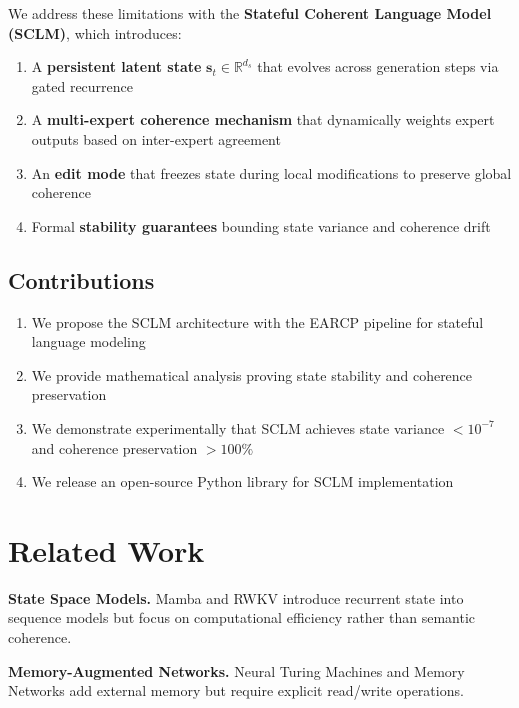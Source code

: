 \documentclass[11pt,a4paper]{article}
\newcommand{\state}{\mathbf{s}}
\newcommand{\Real}{\mathbb{R}}
\begin{document}
We address these limitations with the \textbf{Stateful Coherent Language Model (SCLM)}, which introduces:

\begin{enumerate}
    \item A \textbf{persistent latent state} $\state_t \in \Real^{d_s}$ that evolves across generation steps via gated recurrence
    \item A \textbf{multi-expert coherence mechanism} that dynamically weights expert outputs based on inter-expert agreement
    \item An \textbf{edit mode} that freezes state during local modifications to preserve global coherence
    \item Formal \textbf{stability guarantees} bounding state variance and coherence drift
\end{enumerate}

\subsection{Contributions}

\begin{enumerate}
    \item We propose the SCLM architecture with the EARCP pipeline for stateful language modeling
    \item We provide mathematical analysis proving state stability and coherence preservation
    \item We demonstrate experimentally that SCLM achieves state variance $< 10^{-7}$ and coherence preservation $> 100\%$
    \item We release an open-source Python library for SCLM implementation
\end{enumerate}

\section{Related Work}

\textbf{State Space Models.} Mamba \citep{gu2023mamba} and RWKV \citep{peng2023rwkv} introduce recurrent state into sequence models but focus on computational efficiency rather than semantic coherence.

\textbf{Memory-Augmented Networks.} Neural Turing Machines \citep{graves2014neural} and Memory Networks \citep{weston2014memory} add external memory but require explicit read/write operations.
\end{document}
